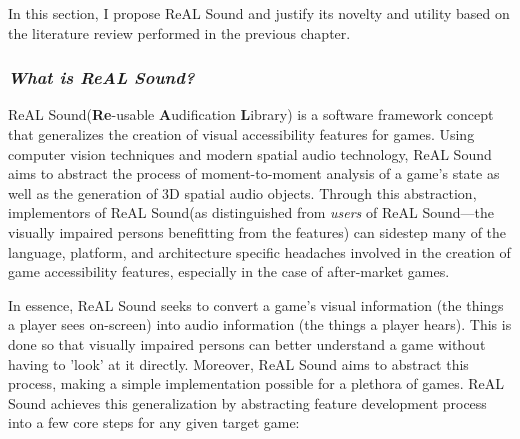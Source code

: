 \documentclass{report}
\newcommand{\rs}{ReAL Sound\xspace}
\newcommand{\rsfull}{\textbf{Re}-usable \textbf{A}udification \textbf{L}ibrary\xspace}
\begin{document}
In this section, I propose \rs and justify its novelty and utility based on the literature review performed in the previous chapter.

\subsubsection{\emph{What is \rs?}}

\begin{figure}
\end{figure}

\rs (\rsfull) is a software framework concept that generalizes the creation of visual accessibility features for games. Using computer vision techniques and modern spatial audio technology, \rs aims to abstract the process of moment-to-moment analysis of a game's state as well as the generation of 3D spatial audio objects. Through this abstraction, implementors of \rs (as distinguished from \emph{users} of \rs---the visually impaired persons benefitting from the features) can sidestep many of the language, platform, and architecture specific headaches involved in the creation of game accessibility features, especially in the case of after-market games. 

In essence, \rs seeks to convert a game's visual information (the things a player sees on-screen) into audio information (the things a player hears). This is done so that visually impaired persons can better understand a game without having to 'look' at it directly. Moreover, \rs aims to abstract this process, making a simple implementation possible for a plethora of games. \rs achieves this generalization by abstracting feature development process into a few core steps for any given target game:
\end{document}
